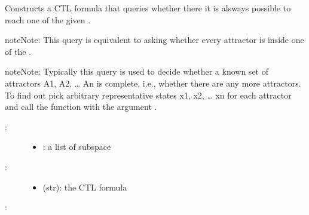 \documentclass[letterpaper,10pt,english]{sphinxmanual}
\begin{document}
\begin{fulllineitems}
\label{\detokenize{TemporalLogic:PyBoolNet.TemporalLogic.AGEF_oneof_subspaces}}
Constructs a CTL formula that queries whether there it is alsways possible to reach one of the given .

\begin{sphinxadmonition}{note}{Note:}
This query is equivalent to asking whether every attractor is inside one of the .
\end{sphinxadmonition}

\begin{sphinxadmonition}{note}{Note:}
Typically this query is used to decide whether a known set of attractors A1, A2, … An is complete, i.e., whether there are any more attractors.
To find out pick arbitrary representative states x1, x2, … xn for each attractor and call the function  with the argument .
\end{sphinxadmonition}
\begin{description}
\item[{:}] \leavevmode\begin{itemize}
\item {} 
: a list of subspace

\end{itemize}

\item[{:}] \leavevmode\begin{itemize}
\item {} 
 (str): the CTL formula

\end{itemize}

\end{description}

:

\begin{sphinxVerbatim}[commandchars=\\\{\}]
  \PYG{p}{[}\PYG{p}{]}
\end{sphinxVerbatim}

\end{fulllineitems}
\end{document}
